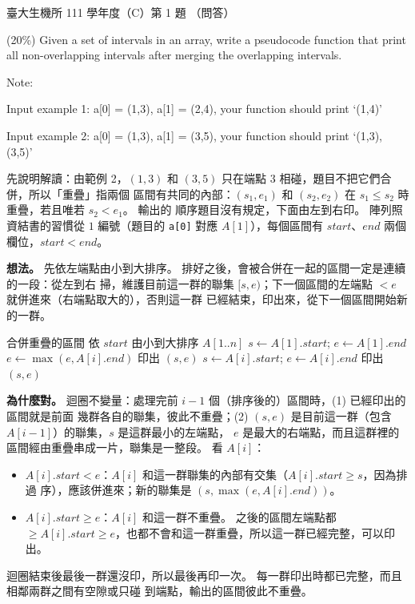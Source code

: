 \begin{pastexam}[label={px:ntu-111-bime-ds-01}]{臺大生機所 111 學年度（C）第 1 題}
（問答）

(20\%) Given a set of intervals in an array, write a pseudocode function that print all
non-overlapping intervals after merging the overlapping intervals.

Note:

\quad Input example 1: a[0] = (1,3), a[1] = (2,4), your function should print `(1,4)'

\quad Input example 2: a[0] = (1,3), a[1] = (3,5), your function should print `(1,3), (3,5)'
\end{pastexam}

\begin{pastsoln}
先說明解讀：由範例 2，$(1,3)$ 和 $(3,5)$ 只在端點 $3$ 相碰，題目不把它們合併，所以「重疊」指兩個
區間有共同的內部：$(s_1, e_1)$ 和 $(s_2, e_2)$ 在 $s_1 \le s_2$ 時重疊，若且唯若 $s_2 < e_1$。 輸出的
順序題目沒有規定，下面由左到右印。 陣列照資結書的習慣從 $1$ 編號（題目的 \texttt{a[0]} 對應
$A[1]$），每個區間有 $\mathit{start}$、$\mathit{end}$ 兩個欄位，$\mathit{start} < \mathit{end}$。

\textbf{想法。} 先依左端點由小到大排序。 排好之後，會被合併在一起的區間一定是連續的一段：從左到右
掃，維護目前這一群的聯集 $[s, e)$；下一個區間的左端點 $< e$ 就併進來（右端點取大的），否則這一群
已經結束，印出來，從下一個區間開始新的一群。
\begin{pseudo}{合併重疊的區間}
        \State \Return
    \EndIf
    \State 依 $\mathit{start}$ 由小到大排序 $A[1..n]$ 
    \State $s \gets A[1].\mathit{start}$; $e \gets A[1].\mathit{end}$
         
            \State $e \gets \max(e, A[i].\mathit{end})$
        \Else
            \State 印出 $(s, e)$ 
            \State $s \gets A[i].\mathit{start}$; $e \gets A[i].\mathit{end}$
        \EndIf
    \EndFor
    \State 印出 $(s, e)$
\EndProcedure
\end{pseudo}

\textbf{為什麼對。} 迴圈不變量：處理完前 $i - 1$ 個（排序後的）區間時，(1) 已經印出的區間就是前面
幾群各自的聯集，彼此不重疊；(2) $(s, e)$ 是目前這一群（包含 $A[i-1]$）的聯集，$s$ 是這群最小的左端點，
$e$ 是最大的右端點，而且這群裡的區間經由重疊串成一片，聯集是一整段。 看 $A[i]$：
\begin{itemize}
\item $A[i].\mathit{start} < e$：$A[i]$ 和這一群聯集的內部有交集（$A[i].\mathit{start} \ge s$，因為排過
序），應該併進來；新的聯集是 $(s, \max(e, A[i].\mathit{end}))$。
\item $A[i].\mathit{start} \ge e$：$A[i]$ 和這一群不重疊。 之後的區間左端點都 $\ge A[i].\mathit{start}
\ge e$，也都不會和這一群重疊，所以這一群已經完整，可以印出。
\end{itemize}
迴圈結束後最後一群還沒印，所以最後再印一次。 每一群印出時都已完整，而且相鄰兩群之間有空隙或只碰
到端點，輸出的區間彼此不重疊。


\end{pastsoln}
